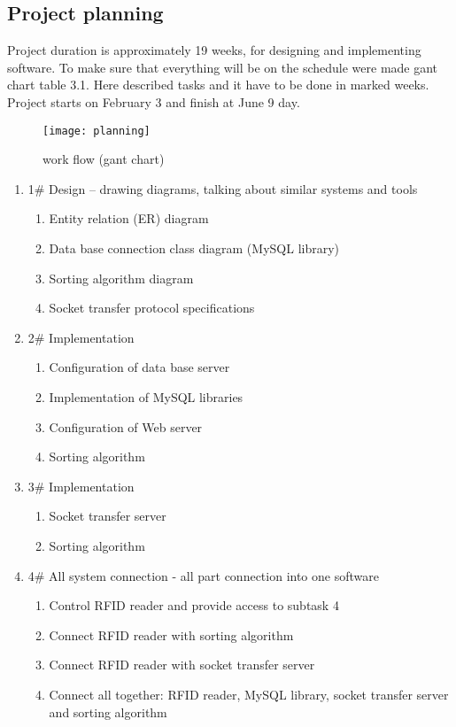 \subsection{Project planning}

Project duration is approximately 19 weeks, for designing and implementing software. To make sure that everything will be on the schedule were made gant chart table 3.1. Here described tasks and it have to be done in marked weeks. Project starts on February 3 and finish at June 9 day.

\begin{figure}[h]
	\centering
		\texttt{[image: planning]}
	\caption{work flow (gant chart)}
	\label{fig:planning}
\end{figure}


\begin{enumerate}
  \item 1\# Design – drawing diagrams, talking about similar systems and tools
  \begin{enumerate}
    \item Entity relation (ER) diagram
    \item Data base connection class diagram (MySQL library)
    \item Sorting algorithm diagram
    \item Socket transfer protocol specifications
  \end{enumerate}
  \item 2\# Implementation
  \begin{enumerate}
    \item Configuration of data base server
    \item Implementation of MySQL libraries
    \item Configuration of Web server
    \item Sorting algorithm
  \end{enumerate} 
  \item 3\# Implementation
  \begin{enumerate}
    \item Socket transfer server
    \item Sorting algorithm
  \end{enumerate}
  \item 4\# All system connection - all part connection into one software
  \begin{enumerate}
    \item Control RFID reader and provide access to subtask 4
    \item Connect RFID reader with sorting algorithm
    \item Connect RFID reader with socket transfer server
    \item Connect all together: RFID reader, MySQL library, socket transfer server and sorting algorithm
  \end{enumerate} 
\end{enumerate}

